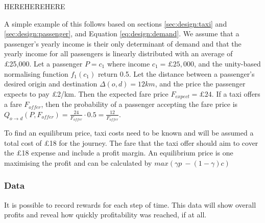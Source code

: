 HEREHEREHERE 

A simple example of this follows based on sections \ref{sec:design:taxi} and
\ref{sec:design:passenger}, and Equation \ref{eq:design:demand}. We assume that
a passenger's yearly income is their only determinant of demand and that the
yearly income for all passengers is linearly distributed with an average of
£25,000. Let a passenger \(P = {c_1} \) where income \(c_1 = £ 25,000\), and
the unity-based normalising function \( f_1(c_1) \) return 0.5. Let the
distance between a passenger's desired origin and destination \(\Delta(o,d) =
12km\), and the price the passenger expects to pay £2/km. Then the expected
fare price \(F_{expect} = £24\). If a taxi offers a fare \(F_{offer}\), then
the probability of a passenger accepting the fare price is \(Q_{o \rightarrow
d} (P,F_{offer}) = \frac{24}{F_{offer}} \cdot 0.5 = \frac{12}{F_{offer}}\).

To find an equilibrum price, taxi costs need to be known and will be assumed a
total cost of £18 for the journey. The fare that the taxi offer should aim to
cover the £18 expense and include a profit margin. An equilibrium price is one
maximising the profit and can be calculated by \(max(\gamma p\ - (1-\gamma)c)\)

\subsubsection{Data}

It is possible to record rewards for each step of time. This data will show
overall profits and reveal how quickly profitability was reached, if at all.
